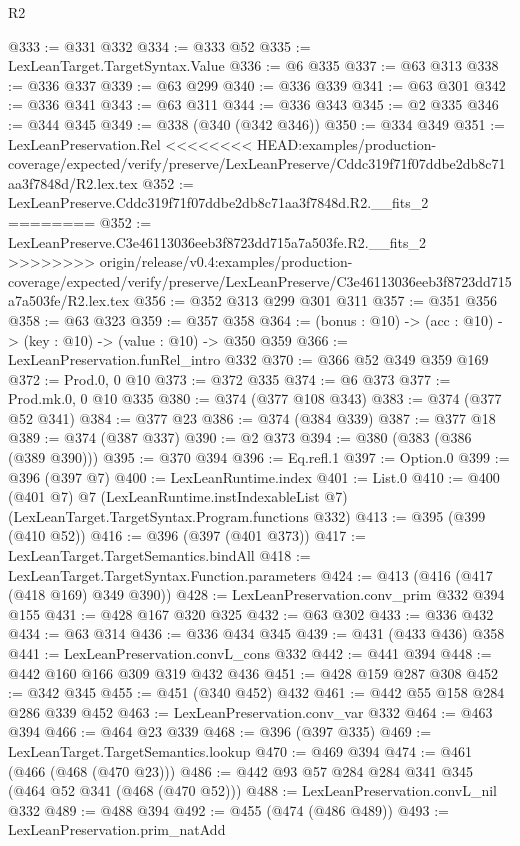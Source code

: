 \begin{lexlean}{R2}
\begin{coremodule}
{{{{{{{{{{{{{{{{{{{{{{@333 := @331 @332
@334 := @333 @52
@335 := LexLeanTarget.TargetSyntax.Value
@336 := @6 @335
@337 := @63 @313
@338 := @336 @337
@339 := @63 @299
@340 := @336 @339
@341 := @63 @301
@342 := @336 @341
@343 := @63 @311
@344 := @336 @343
@345 := @2 @335
@346 := @344 @345
@349 := @338 (@340 (@342 @346))
@350 := @334 @349
@351 := LexLeanPreservation.Rel
<<<<<<<< HEAD:examples/production-coverage/expected/verify/preserve/LexLeanPreserve/Cddc319f71f07ddbe2db8c71aa3f7848d/R2.lex.tex
@352 := LexLeanPreserve.Cddc319f71f07ddbe2db8c71aa3f7848d.R2.__fits_2
========
@352 := LexLeanPreserve.C3e46113036eeb3f8723dd715a7a503fe.R2.__fits_2
>>>>>>>> origin/release/v0.4:examples/production-coverage/expected/verify/preserve/LexLeanPreserve/C3e46113036eeb3f8723dd715a7a503fe/R2.lex.tex
@356 := @352 @313 @299 @301 @311
@357 := @351 @356
@358 := @63 @323
@359 := @357 @358
@364 := (bonus : @10) -> (acc : @10) -> (key : @10) -> (value : @10) -> @350 @359
@366 := LexLeanPreservation.funRel_intro @332
@370 := @366 @52 @349 @359 @169
@372 := Prod.{0, 0} @10
@373 := @372 @335
@374 := @6 @373
@377 := Prod.mk.{0, 0} @10 @335
@380 := @374 (@377 @108 @343)
@383 := @374 (@377 @52 @341)
@384 := @377 @23
@386 := @374 (@384 @339)
@387 := @377 @18
@389 := @374 (@387 @337)
@390 := @2 @373
@394 := @380 (@383 (@386 (@389 @390)))
@395 := @370 @394
@396 := Eq.refl.{1}
@397 := Option.{0}
@399 := @396 (@397 @7)
@400 := LexLeanRuntime.index
@401 := List.{0}
@410 := @400
    (@401 @7)
    @7
    (LexLeanRuntime.instIndexableList @7)
    (LexLeanTarget.TargetSyntax.Program.functions @332)
@413 := @395 (@399 (@410 @52))
@416 := @396 (@397 (@401 @373))
@417 := LexLeanTarget.TargetSemantics.bindAll
@418 := LexLeanTarget.TargetSyntax.Function.parameters
@424 := @413 (@416 (@417 (@418 @169) @349 @390))
@428 := LexLeanPreservation.conv_prim @332 @394 @155
@431 := @428 @167 @320 @325
@432 := @63 @302
@433 := @336 @432
@434 := @63 @314
@436 := @336 @434 @345
@439 := @431 (@433 @436) @358
@441 := LexLeanPreservation.convL_cons @332
@442 := @441 @394
@448 := @442 @160 @166 @309 @319 @432 @436
@451 := @428 @159 @287 @308
@452 := @342 @345
@455 := @451 (@340 @452) @432
@461 := @442 @55 @158 @284 @286 @339 @452
@463 := LexLeanPreservation.conv_var @332
@464 := @463 @394
@466 := @464 @23 @339
@468 := @396 (@397 @335)
@469 := LexLeanTarget.TargetSemantics.lookup
@470 := @469 @394
@474 := @461 (@466 (@468 (@470 @23)))
@486 := @442 @93 @57 @284 @284 @341 @345 (@464 @52 @341 (@468 (@470 @52)))
@488 := LexLeanPreservation.convL_nil @332
@489 := @488 @394
@492 := @455 (@474 (@486 @489))
@493 := LexLeanPreservation.prim_natAdd
}}}}}}}}}}}}}}}}}}}}}}
\end{coremodule}
\end{lexlean}
